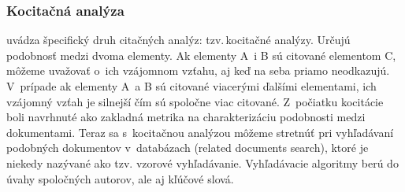 \begin{frame}
  \frametitle{Kocitačná analýza}

\citet{Vavrikova2008} uvádza špecifický druh citačných analýz: tzv.\,kocitačné
analýzy.   Určujú podobnosť medzi dvoma elementy. Ak
elementy A~i B sú citované elementom C, môžeme uvažovať o~ich vzájomnom vzťahu,
aj keď na seba priamo neodkazujú. V~prípade ak elementy A~a B sú citované
viacerými ďalšími elementami, ich vzájomný vzťah je silnejší čím sú spoločne
viac citované. Z~počiatku kocitácie boli navrhnuté ako zakladná metrika na
charakterizáciu podobnosti medzi dokumentami. Teraz sa s~kocitačnou analýzou
môžeme stretnúť pri vyhľadávaní podobných dokumentov v~databázach (related
documents search), ktoré je niekedy nazývané ako  tzv.
vzorové vyhľadávanie. Vyhľadávacie algoritmy berú do úvahy spoločných autorov,
ale aj kľúčové slová.

\end{frame}


